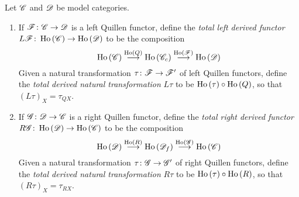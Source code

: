 \documentclass[10pt]{amsart}
\begin{document}
\begin{defn}
  Let $\C$ and $\D$ be model categories.
  \begin{enumerate}
  \item
    If $\F \colon \C \to \D$ is a left Quillen functor, define the {\it total left derived functor} $L\F \colon \Ho{\C} \to \Ho{\D}$ to be the composition
    $$\Ho{\C} \overset{\Ho{Q}}\longrightarrow \Ho{\C_c} \overset{\Ho{\F}}\longrightarrow \Ho{\D}$$
    Given a natural transformation $\tau \colon \F \to \F^\prime$ of left Quillen functors, define the {\it total derived natural transformation} $L\tau$ to be $\Ho{\tau} \circ \Ho{Q}$, so that $(L\tau)_X = \tau_{QX}$.
  \item
    If $\G \colon \D \to \C$ is a right Quillen functor, define the {\it total right derived functor} $R\G \colon \Ho{\D} \to \Ho{\C}$ to be the composition
    $$\Ho{\D} \overset{\Ho{R}}\longrightarrow \Ho{\D_f} \overset{\Ho{\G}}\longrightarrow \Ho{\C}$$
    Given a natural transformation $\tau \colon \G \to \G^\prime$ of right Quillen functors, define the {\it total derived natural transformation} $R\tau$ to be $\Ho{\tau} \circ \Ho{R}$, so that $(R\tau)_X = \tau_{RX}$.
  \end{enumerate}
\end{defn}
\end{document}
